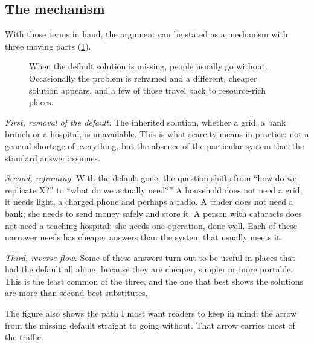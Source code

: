 \subsection{The mechanism}

With those terms in hand, the argument can be stated as a mechanism with three
moving parts (\cref{fig:mechanism}).

\begin{figure}[htbp]
\centering

\caption{ When the default solution is missing, people usually
go without. Occasionally the problem is reframed and a different, cheaper
solution appears, and a few of those travel back to resource-rich places.
}
\label{fig:mechanism}
\end{figure}

\emph{First, removal of the default.} The inherited solution, whether a grid,
a bank branch or a hospital, is unavailable. This is what scarcity means in
practice: not a general shortage of everything, but the absence of the
particular system that the standard answer assumes.

\emph{Second, reframing.} With the default gone, the question shifts from
``how do we replicate X?'' to ``what do we actually need?'' A household does
not need a grid; it needs light, a charged phone and perhaps a radio. A trader
does not need a bank; she needs to send money safely and store it. A person
with cataracts does not need a teaching hospital; she needs one operation, done
well. Each of these narrower needs has cheaper answers than the system that
usually meets it.

\emph{Third, reverse flow.} Some of these answers turn out to be useful in
places that had the default all along, because they are cheaper, simpler or
more portable. This is the least common of the three, and the one that best
shows the solutions are more than second-best substitutes.

The figure also shows the path I most want readers to keep in mind: the arrow
from the missing default straight to going without. That arrow carries most of
the traffic.

